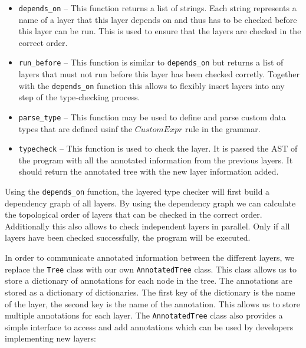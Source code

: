 \begin{itemize}
	\item \texttt{depends\_on} -- This function returns a list of strings. Each string represents a name of a layer that this layer depends on and thus has to be checked before this layer can be run. This is used to ensure that the layers are checked in the correct order.
	\item \texttt{run\_before} -- This function is similar to \texttt{depends\_on} but returns a list of layers that must not run before this layer has been checked corretly. Together with the \texttt{depends\_on} function this allows to flexibly insert layers into any step of the type-checking process.
	\item \texttt{parse\_type} -- This function may be used to define and parse custom data types that are defined usinf the $CustomExpr$ rule in the grammar. 
	\item \texttt{typecheck} -- This function is used to check the layer. It is passed the AST of the program with all the annotated information from the previous layers. It should return the annotated tree with the new layer information added.
\end{itemize}

Using the \texttt{depends\_on} function, the layered type checker will first build a dependency graph of all layers. By using the dependency graph we can calculate the topological order of layers that can be checked in the correct order. Additionally this also allows to check independent layers in parallel. Only if all layers have been checked successfully, the program will be executed.

In order to communicate annotated information between the different layers, we replace the \texttt{Tree} \Lark{} class with our own \texttt{AnnotatedTree} class. This class allows us to store a dictionary of annotations for each node in the tree. The annotations are stored as a dictionary of dictionaries. The first key of the dictionary is the name of the layer, the second key is the name of the annotation. This allows us to store multiple annotations for each layer. The \texttt{AnnotatedTree} class also provides a simple interface to access and add annotations which can be used by developers implementing new layers:

